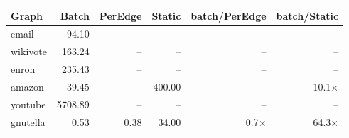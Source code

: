 \begin{tabular}{lrrrrr}
\toprule
Graph & Batch & PerEdge & Static & batch/PerEdge & batch/Static \\
\midrule
email & 94.10 & -- & -- & -- & -- \\
wikivote & 163.24 & -- & -- & -- & -- \\
enron & 235.43 & -- & -- & -- & -- \\
amazon & 39.45 & -- & 400.00 & -- & 10.1$\times$ \\
youtube & 5708.89 & -- & -- & -- & -- \\
gnutella & 0.53 & 0.38 & 34.00 & 0.7$\times$ & 64.3$\times$ \\
\bottomrule
\end{tabular}

